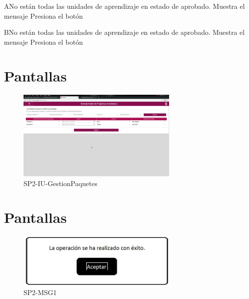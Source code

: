 \label{SP2-CU5-A}
\begin{UCtrayectoriaA}{A}{No están todas las unidades de aprendizaje en estado de aprobado.}
    \UCpaso Muestra el mensaje 
    \UCpaso[\UCactor] Presiona el botón 
\end{UCtrayectoriaA}


\label{SP2-CU5-B}
\begin{UCtrayectoriaB}{B}{No están todas las unidades de aprendizaje en estado de aprobado.}
    \UCpaso Muestra el mensaje 
    \UCpaso[\UCactor] Presiona el botón 
\end{UCtrayectoriaB}


\chapter{Pantallas}
 \begin{figure}
  \centering
    \includegraphics[width=0.7\textwidth]{DCU/SP2/Pantallas/GestionPaquetes}
  \caption{SP2-IU-GestionPaquetes}
  \label{SP2-IU-GestionPaquetes}
\end{figure}

\chapter{Pantallas}
 \begin{figure}
  \centering
    \includegraphics[width=0.7\textwidth]{DCU/SP2/mensajes/MSG1}
   \caption{SP2-MSG1}
  \label{SP2-MSG1}
\end{figure}

